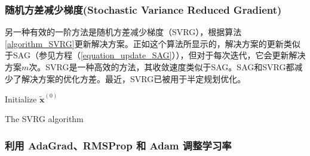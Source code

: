 \documentclass[lang=cn,10pt]{gorgeousnbook}
\numberwithin{equation}{section}%
\numberwithin{figure}{section}%
\begin{document}
\subsubsection{随机方差减少梯度(Stochastic Variance Reduced Gradient)}

另一种有效的一阶方法是随机方差减少梯度（SVRG），根据算法\ref{algorithm_SVRG}更新解决方案。正如这个算法所显示的，解决方案的更新类似于SAG（参见方程（\ref{equation_update_SAG}）），但对于每次迭代，它会更新解决方案$m$次。SVRG是一种高效的方法，其收敛速度类似于SAG。SAG和SVRG都减少了解决方案的优化方差。最近，SVRG已被用于半定规划优化。

\SetAlCapSkip{0.5em}
\IncMargin{0.8em}
\begin{algorithm2e}[!t]
\DontPrintSemicolon
    Initialize $\widetilde{\boldsymbol{x}}^{(0)}$\;
\caption{The SVRG algorithm}\label{algorithm_SVRG}
\end{algorithm2e}
\DecMargin{0.8em}

\subsubsection{利用 AdaGrad、RMSProp 和 Adam 调整学习率}

\end{document}
